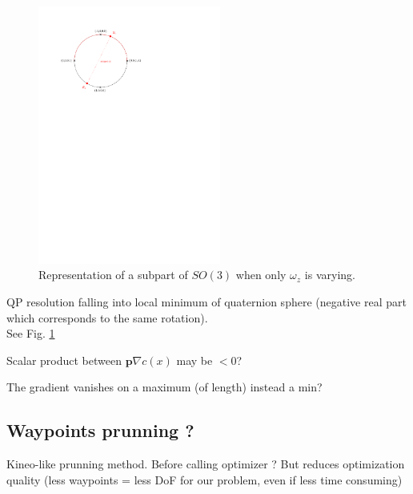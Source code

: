 \documentclass {article}
\begin{document}
\begin{figure}[!h]
	\centering
	\includegraphics[width=6cm]{quaternions.pdf}
	\caption{Representation of a subpart of $SO(3)$ when only $\omega_z$ is 
	varying.}
	\label{fig:quaternions}
\end{figure}

QP resolution falling into local minimum of quaternion sphere (negative real part 
which corresponds to the same rotation).\\
See Fig. \ref{fig:quaternions}

Scalar product between $\mathbf{p}\nabla c(x)$ may be $<0$?

The gradient vanishes on a maximum (of length) instead a min?

\vspace{0.4cm}

\subsection{Waypoints prunning ?}
Kineo-like prunning method. Before calling optimizer ? But reduces optimization quality 
(less waypoints = less DoF for our problem, even if less time consuming)
\end{document}
